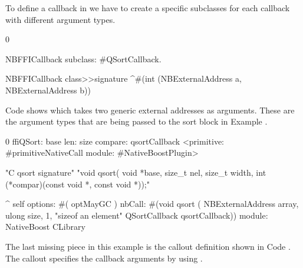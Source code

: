 To define a callback in \NB we have to create a specific subclasses for each callback with different argument types.
%
\begin{stcode}[
	label={lst:callbackDefinition},
	caption={Example of callback definition}]{0}

NBFFICallback
    subclass: #QSortCallback.

NBFFICallback class>>signature
	^#(int (NBExternalAddress a, NBExternalAddress b))
\end{stcode}
%
Code  shows  which takes two generic external addresses as arguments.
These are the argument types that are being passed to the sort block in Example .
%
\begin{stcode}[
	label={lst:qsort},
	caption={Example of callout passing a callback}]{0}
ffiQSort: base len: size compare: qsortCallback
	<primitive: #primitiveNativeCall
	 module: #NativeBoostPlugin>

	"C qsort signature"
	"void qsort(
		void *base,
		size_t nel,
		size_t width,
		int (*compar)(const void *, const void *));"

	^ self
		options: #( optMayGC )
		nbCall: #(void qsort (
					NBExternalAddress array,
					ulong size,
					1, "sizeof an element"
					QSortCallback qsortCallback))
		module: NativeBoost CLibrary
\end{stcode}
%
The last missing piece in this example is the callout definition shown in Code .
The \NB callout specifies the callback arguments by using .




